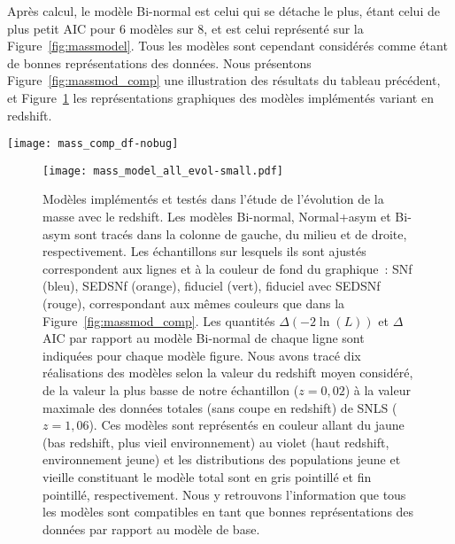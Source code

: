 \documentclass[../main/main.tex]{subfiles}
\begin{document}
Après calcul, le modèle Bi-normal est celui qui se détache le plus, étant celui de
plus petit AIC pour 6 modèles sur 8, et est celui représenté sur la
Figure~\ref{fig:massmodel}. Tous les modèles sont cependant considérés comme
étant de bonnes représentations des données. Nous présentons
Figure~\ref{fig:massmod_comp} une illustration des résultats du tableau
précédent, et Figure~\ref{fig:massmod_all} les représentations graphiques des
modèles implémentés variant en redshift.

\begin{SCfigure}[1][h!]
    \centering
    \texttt{[image: mass\_comp\_df-nobug]}
    \caption[$\Delta$AIC entre le modèle Bi-normal et les autres
    modèles]{$\Delta$AIC entre le modèle Bi-normal et les autres modèles (voir
        Tableau~\ref{tab:modelcomp}). Tous les modèles sont dérivants. Les
        marqueurs bleus, orange, verts et rouges montrent les résultats lorsque
        l'analyse est effectuée sur l'échantillon SNf, SEDSNf, fiduciel,
        fiduciel avec SEDSNf, respectivement (voir légende). Les bandes de
        couleur illustrent la validité des modèles, d'acceptable ($\Delta$AIC >
        -5) à exclu ($\Delta$AIC < -20). En suivant ces valeurs d'AIC, tous les
        modèles sont compatibles entre eux.}
    \label{fig:massmod_comp}
\end{SCfigure}

\begin{figure}[htbp]
    \vspace*{-2.7cm}
    \centerfloat
    \texttt{[image: mass\_model\_all\_evol-small.pdf]}
    \caption[Modèles implémentés et testés dans l'étude de l'évolution de
    l'étirement avec le redshift]{\scriptsize Modèles implémentés et testés dans
        l'étude de l'évolution de la masse avec le redshift. Les modèles
        Bi-normal, Normal+asym et Bi-asym sont tracés dans la colonne de gauche,
        du milieu et de droite, respectivement. Les échantillons sur lesquels
        ils sont ajustés correspondent aux lignes et à la couleur de fond du
        graphique~: SNf (bleu), SEDSNf (orange), fiduciel (vert), fiduciel avec
        SEDSNf (rouge), correspondant aux mêmes couleurs que dans la
        Figure~\ref{fig:massmod_comp}. Les quantités $\Delta(-2\ln(L))$ et
        $\Delta$AIC par rapport au modèle Bi-normal de chaque ligne sont
        indiquées pour chaque modèle figure. Nous avons tracé dix réalisations
        des modèles selon la valeur du redshift moyen considéré, de la valeur la
        plus basse de notre échantillon ($z = 0,02$) à la valeur maximale des
        données totales (sans coupe en redshift) de SNLS ($z = 1,06$). Ces
        modèles sont représentés en couleur allant du jaune (bas redshift, plus
        vieil environnement) au violet (haut redshift, environnement jeune) et
        les distributions des populations jeune et vieille constituant le modèle
        total sont en gris pointillé et fin pointillé, respectivement. Nous y
        retrouvons l'information que tous les modèles sont compatibles en tant
    que bonnes représentations des données par rapport au modèle de base.}
    \label{fig:massmod_all}
\end{figure}
\end{document}
